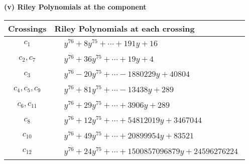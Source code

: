 \documentclass[1p]{elsarticle_modified}
\theoremstyle{definition}
\begin{document}
\newpage\renewcommand{\arraystretch}{1}
\flushleft \textbf{(v) Riley Polynomials at the component}\newline \\
\begin{tabular}{m{50pt}|m{274pt}}
Crossings & \hspace{64pt}Riley Polynomials at each crossing \\
\hline $$\begin{aligned}c_{1}\end{aligned}$$&$\begin{aligned}
&y^{76}+8 y^{75}+\cdots+191 y+16
\end{aligned}$\\
\hline $$\begin{aligned}c_{2},c_{7}\end{aligned}$$&$\begin{aligned}
&y^{76}+36 y^{75}+\cdots+19 y+4
\end{aligned}$\\
\hline $$\begin{aligned}c_{3}\end{aligned}$$&$\begin{aligned}
&y^{76}-20 y^{75}+\cdots-1880229 y+40804
\end{aligned}$\\
\hline $$\begin{aligned}c_{4},c_{5},c_{9}\end{aligned}$$&$\begin{aligned}
&y^{76}+81 y^{75}+\cdots-13438 y+289
\end{aligned}$\\
\hline $$\begin{aligned}c_{6},c_{11}\end{aligned}$$&$\begin{aligned}
&y^{76}+29 y^{75}+\cdots+3906 y+289
\end{aligned}$\\
\hline $$\begin{aligned}c_{8}\end{aligned}$$&$\begin{aligned}
&y^{76}+12 y^{75}+\cdots+54812019 y+3467044
\end{aligned}$\\
\hline $$\begin{aligned}c_{10}\end{aligned}$$&$\begin{aligned}
&y^{76}+49 y^{75}+\cdots+20899954 y+83521
\end{aligned}$\\
\hline $$\begin{aligned}c_{12}\end{aligned}$$&$\begin{aligned}
&y^{76}+24 y^{75}+\cdots+1500857096879 y+24596276224
\end{aligned}$\\
\hline
\end{tabular}\\~\\
\end{document}
